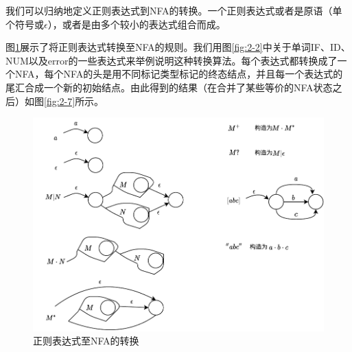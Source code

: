 \documentclass[cn,11pt,chinese]{elegantbook}
\begin{document}
我们可以归纳地定义正则表达式到NFA的转换。一个正则表达式或者是原语（单个符号或$\epsilon$），或者是由多个较小的表达式组合而成。

图\ref{fig:2-6}展示了将正则表达式转换至NFA的规则。我们用图\ref{fig:2-2}中关于单词IF、ID、NUM以及error的一些表达式来举例说明这种转换算法。每个表达式都转换成了一个NFA，每个NFA的头是用不同标记类型标记的终态结点，并且每一个表达式的尾汇合成一个新的初始结点。由此得到的结果（在合并了某些等价的NFA状态之后）如图\ref{fig:2-7}所示。

\begin{figure}[htbp]
  \centering
  \includegraphics[width=.5\textwidth]{2-6.pdf}
  \caption{正则表达式至NFA的转换}
  \label{fig:2-6}
\end{figure}
\end{document}
